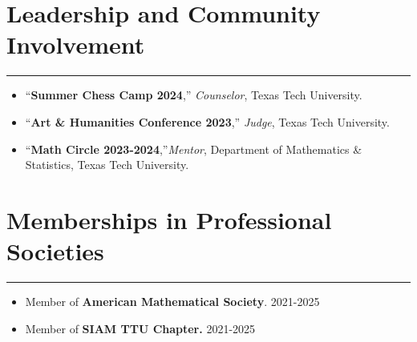 \documentclass[12pt]{book}
\begin{document}
 \section*{Leadership and Community Involvement}
\rule{\textwidth}{1pt}
\begin{itemize}
	\item ``\textbf{Summer Chess Camp 2024},'' \textit{Counselor}, Texas Tech University. 
	\item ``\textbf{Art \& Humanities Conference 2023},'' \textit{Judge}, Texas Tech University.  
	\item ``\textbf{Math Circle 2023-2024},''\textit{Mentor}, Department of Mathematics \& Statistics, Texas Tech University. 
\end{itemize}





\section*{Memberships in Professional Societies}
 \rule{\textwidth}{1pt}
 \begin{itemize}
 	\item Member of \textbf{American Mathematical Society}. \hfill  2021-2025
	\item Member of \textbf{SIAM TTU Chapter.} \hfill 2021-2025
 \end{itemize}
\end{document}
